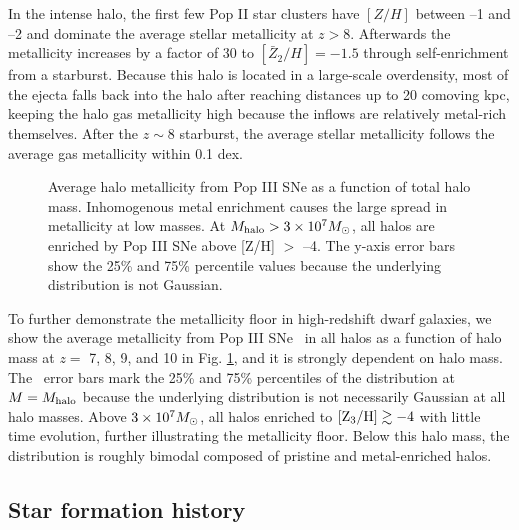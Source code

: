\documentclass[apjl]{emulateapj}
\begin{document}
In the intense halo, the first few Pop II star clusters have $[Z/H]$
between --1 and --2 and dominate the average stellar metallicity at $z
> 8$.  Afterwards the metallicity increases by a factor of 30 to
$[\bar{Z}_2/H] = -1.5$ through self-enrichment from a starburst.
Because this halo is located in a large-scale overdensity, most of the
ejecta falls back into the halo after reaching distances up to 20
comoving kpc, keeping the halo gas metallicity high because the
inflows are relatively metal-rich themselves.  After the $z \sim 8$
starburst, the average stellar metallicity follows the average gas
metallicity within 0.1 dex.


\begin{figure}
\caption{\label{fig:z3} Average halo metallicity from Pop III SNe as a
  function of total halo mass.  Inhomogenous metal enrichment causes
  the large spread in metallicity at low masses.  At $M_{\rm halo} > 3
  \times 10^7 \Ms$, all halos are enriched by Pop III SNe above [Z/H]
  $>$ --4.  The y-axis error bars show the 25\% and 75\% percentile
  values because the underlying distribution is not Gaussian.}
\end{figure}


To further demonstrate the metallicity floor in high-redshift dwarf
galaxies, we show the average metallicity from Pop III SNe \zthree~in
all halos as a function of halo mass at $z =$ 7, 8, 9, and 10 in
Fig. \ref{fig:z3}, and it is strongly dependent on halo mass.  The
\zthree~error bars mark the 25\% and 75\% percentiles of the
distribution at $M = M_{\rm halo}$ because the underlying distribution
is not necessarily Gaussian at all halo masses.  Above $3 \times 10^7
\Ms$, all halos enriched to $\zthree \ga -4$ with little time
evolution, further illustrating the metallicity floor.  Below this
halo mass, the distribution is roughly bimodal composed of pristine
and metal-enriched halos.

\subsection{Star formation history}
\label{sec:pop}

\end{document}
